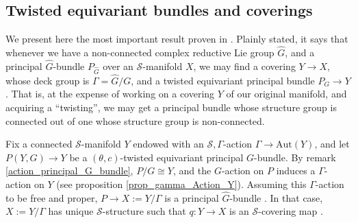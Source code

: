 \subsection{Twisted equivariant bundles and coverings}
We present here the most important result proven in \parencite{barajas2023non}. Plainly stated, it says that whenever we have a non-connected complex reductive Lie group \(\hat{G}\), and a principal \(\hat{{G}}\)-bundle \(P_{\hat{G}}\) over an \(\mathcal{S}\)-manifold \(X\), we may find a covering \(Y \to X\), whose deck group is \(\Gamma=\hat{{G}}/G\), and a twisted equivariant principal bundle \(P_G \to Y\). That is, at the expense of working on a covering \(Y\) of our original manifold, and acquiring a ``twisting'', we may get a principal bundle whose structure group is connected out of one whose structure group is non-connected. 

Fix a connected \(\mathcal{S}\)-manifold \(Y\) endowed with an \(\mathcal{S},\Gamma\)-action \(\Gamma \to \mathrm{Aut}(Y)\), and let \(P(Y,G)\to Y\) be a \((\theta, c)\)-twisted equivariant principal \(G\)-bundle. By remark \ref{action_principal_G_bundle}, \(P/G \cong Y\), and the \(G\)-action on \(P\) induces a \(\Gamma\)-action on \(Y\) (see proposition \ref{prop_gamma_Action_Y}). Assuming this \(\Gamma\)-action to be free and proper, \(P \to X:=Y/\Gamma\) is a principal \(\hat{G}\)-bundle \parencite[Sec. 4.1]{barajas2023non}. In that case, \(X:=Y/\Gamma\) has unique \(\mathcal{S}\)-structure such that \(q\colon Y \to X\) is an \(\mathcal{S}\)-covering map \parencite[Th. 21.13]{lee_introSM}.


